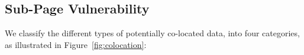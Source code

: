 \subsection{Sub-Page Vulnerability}\label{sec:subpage}

We classify the different types of potentially co-located data, into four categories, as illustrated in Figure~\ref{fig:colocation}:

